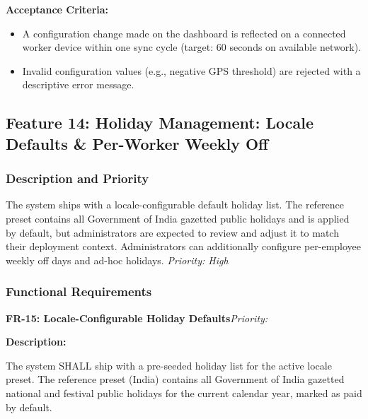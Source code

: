 \documentclass[12pt, a4paper]{article}
\newcommand{\frblock}[2]{%
    \noindent\textbf{#1}\hfill\textit{Priority: #2}%
    \par\smallskip%
}
\newcommand{\srsfield}[1]{\noindent\textbf{#1:}\par}
\begin{document}
\srsfield{Acceptance Criteria}
\begin{itemize}
    \item A configuration change made on the dashboard is reflected on
          a connected worker device within one sync cycle (target:
          60 seconds on available network).
    \item Invalid configuration values (e.g., negative GPS threshold)
          are rejected with a descriptive error message.
\end{itemize}

\subsection{Feature 14: Holiday Management: Locale Defaults \&
Per-Worker Weekly Off}

\subsubsection*{Description and Priority}
The system ships with a locale-configurable default holiday list. The
reference preset contains all Government of India gazetted public
holidays and is applied by default, but administrators are expected to
review and adjust it to match their deployment context. Administrators
can additionally configure per-employee weekly off days and ad-hoc
holidays.
\hfill \textit{Priority: High}

\subsubsection*{Functional Requirements}

\frblock{FR-15: Locale-Configurable Holiday Defaults}{}

\srsfield{Description}
The system SHALL ship with a pre-seeded holiday list for the active
locale preset. The reference preset (India) contains all Government of
India gazetted national and festival public holidays for the current
calendar year, marked as paid by default.
\end{document}
